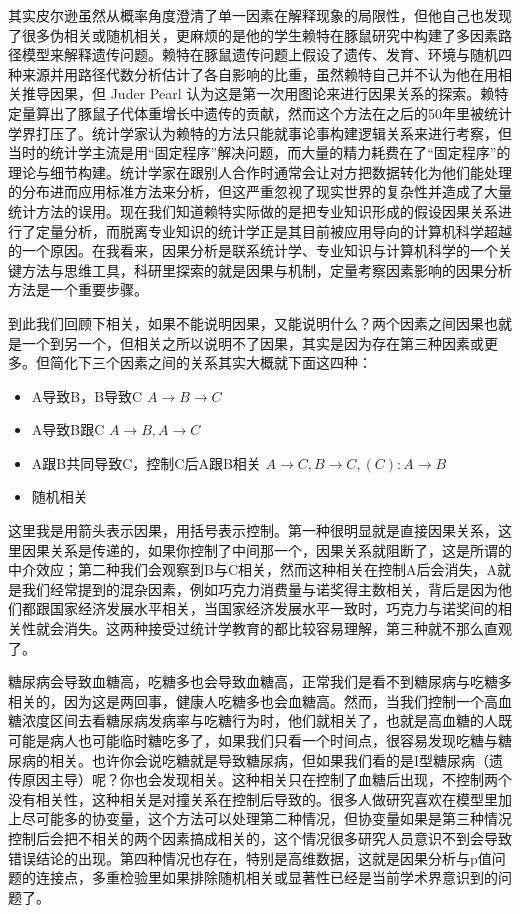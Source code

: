 \documentclass[]{tufte-book}
\providecommand{\tightlist}{%
  \setlength{\itemsep}{0pt}\setlength{\parskip}{0pt}}
\begin{document}
其实皮尔逊虽然从概率角度澄清了单一因素在解释现象的局限性，但他自己也发现了很多伪相关或随机相关，更麻烦的是他的学生赖特在豚鼠研究中构建了多因素路径模型来解释遗传问题。赖特在豚鼠遗传问题上假设了遗传、发育、环境与随机四种来源并用路径代数分析估计了各自影响的比重，虽然赖特自己并不认为他在用相关推导因果，但 Juder Pearl 认为这是第一次用图论来进行因果关系的探索。赖特定量算出了豚鼠子代体重增长中遗传的贡献，然而这个方法在之后的50年里被统计学界打压了。统计学家认为赖特的方法只能就事论事构建逻辑关系来进行考察，但当时的统计学主流是用``固定程序''解决问题，而大量的精力耗费在了``固定程序''的理论与细节构建。统计学家在跟别人合作时通常会让对方把数据转化为他们能处理的分布进而应用标准方法来分析，但这严重忽视了现实世界的复杂性并造成了大量统计方法的误用。现在我们知道赖特实际做的是把专业知识形成的假设因果关系进行了定量分析，而脱离专业知识的统计学正是其目前被应用导向的计算机科学超越的一个原因。在我看来，因果分析是联系统计学、专业知识与计算机科学的一个关键方法与思维工具，科研里探索的就是因果与机制，定量考察因素影响的因果分析方法是一个重要步骤。

到此我们回顾下相关，如果不能说明因果，又能说明什么？两个因素之间因果也就是一个到另一个，但相关之所以说明不了因果，其实是因为存在第三种因素或更多。但简化下三个因素之间的关系其实大概就下面这四种：

\begin{itemize}
\tightlist
\item
  A导致B，B导致C \(A\rightarrow B\rightarrow C\)
\item
  A导致B跟C \(A\rightarrow B, A\rightarrow C\)
\item
  A跟B共同导致C，控制C后A跟B相关 \(A\rightarrow C, B\rightarrow C, (C): A \rightarrow B\)
\item
  随机相关
\end{itemize}

这里我是用箭头表示因果，用括号表示控制。第一种很明显就是直接因果关系，这里因果关系是传递的，如果你控制了中间那一个，因果关系就阻断了，这是所谓的中介效应；第二种我们会观察到B与C相关，然而这种相关在控制A后会消失，A就是我们经常提到的混杂因素，例如巧克力消费量与诺奖得主数相关，背后是因为他们都跟国家经济发展水平相关，当国家经济发展水平一致时，巧克力与诺奖间的相关性就会消失。这两种接受过统计学教育的都比较容易理解，第三种就不那么直观了。

糖尿病会导致血糖高，吃糖多也会导致血糖高，正常我们是看不到糖尿病与吃糖多相关的，因为这是两回事，健康人吃糖多也会血糖高。然而，当我们控制一个高血糖浓度区间去看糖尿病发病率与吃糖行为时，他们就相关了，也就是高血糖的人既可能是病人也可能临时糖吃多了，如果我们只看一个时间点，很容易发现吃糖与糖尿病的相关。也许你会说吃糖就是导致糖尿病，但如果我们看的是I型糖尿病（遗传原因主导）呢？你也会发现相关。这种相关只在控制了血糖后出现，不控制两个没有相关性，这种相关是对撞关系在控制后导致的。很多人做研究喜欢在模型里加上尽可能多的协变量，这个方法可以处理第二种情况，但协变量如果是第三种情况控制后会把不相关的两个因素搞成相关的，这个情况很多研究人员意识不到会导致错误结论的出现。第四种情况也存在，特别是高维数据，这就是因果分析与p值问题的连接点，多重检验里如果排除随机相关或显著性已经是当前学术界意识到的问题了。
\end{document}
